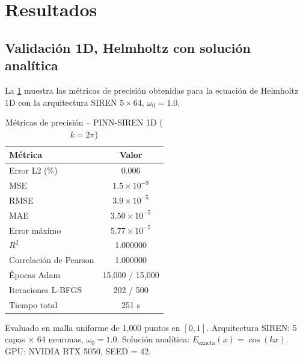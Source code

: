 
\section{Resultados}
\label{sec:resultados}

\subsection{Validación 1D, Helmholtz con solución analítica}
\label{subsec:resultados1d}

La \cref{tab:resultados1d} muestra las métricas de precisión obtenidas para la
ecuación de Helmholtz 1D con la arquitectura SIREN $5\times64$, $\omega_0 = 1.0$.

\begin{table}[htbp]
\centering
\begin{threeparttable}
\caption{Métricas de precisión -- PINN-SIREN 1D ($k = 2\pi$)}
\label{tab:resultados1d}
\begin{tabular}{lc}
\toprule
Métrica & Valor \\
\midrule
Error L2 (\%)          & 0.006 \\
MSE                    & $1.5 \times 10^{-9}$ \\
RMSE                   & $3.9 \times 10^{-5}$ \\
MAE                    & $3.50 \times 10^{-5}$ \\
Error máximo           & $5.77 \times 10^{-5}$ \\
$R^2$                  & 1.000000 \\
Correlación de Pearson & 1.000000 \\
\midrule
Épocas Adam            & 15{,}000 / 15{,}000 \\
Iteraciones L-BFGS     & 202 / 500 \\
Tiempo total           & 251 s \\
\bottomrule
\end{tabular}
\begin{tablenotes}
\small
\item Evaluado en malla uniforme de 1{,}000 puntos en $[0,1]$.
      Arquitectura SIREN: 5 capas $\times$ 64 neuronas, $\omega_0 = 1.0$.
      Solución analítica: $E_{\mathrm{exacta}}(x) = \cos(kx)$.
      GPU: NVIDIA RTX 5050, SEED = 42.
\end{tablenotes}
\end{threeparttable}
\end{table}

